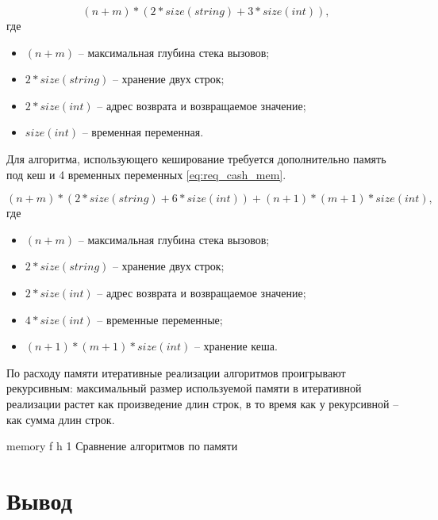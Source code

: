\begin{equation}
	\label{eq:rec_mem}
	(n + m) * (2 * size(string) + 3 * size(int)),
\end{equation}
где 
\begin{itemize}
	\item $ (n + m) $ -- максимальная глубина стека вызовов;
	\item $ 2 * size(string) $ -- хранение двух строк;
	\item $ 2 * size(int) $ -- адрес возврата и возвращаемое значение;
	\item $ size(int) $ -- временная переменная.
\end{itemize}

Для алгоритма, использующего кеширование требуется дополнительно память под кеш и 4 временных переменных \eqref{eq:req_cash_mem}.

\begin{equation}
	\label{eq:req_cash_mem}
	(n + m) * (2 * size(string) + 6 * size(int)) + (n + 1) * (m + 1) * size(int),
\end{equation}
где 
\begin{itemize}
	\item $ (n + m) $ -- максимальная глубина стека вызовов;
	\item $ 2 * size(string) $ -- хранение двух строк;
	\item $ 2 * size(int) $ -- адрес возврата и возвращаемое значение;
	\item $ 4 * size(int) $ -- временные переменные;
	\item $ (n + 1) * (m + 1) * size(int) $ -- хранение кеша.
\end{itemize}

По расходу памяти итеративные реализации алгоритмов проигрывают рекурсивным: максимальный размер используемой памяти в итеративной реализации растет
как произведение длин строк, в то время как у рекурсивной --
как сумма длин строк.

{memory} %
{f} %
{h} %
{1\textwidth} %
{Сравнение алгоритмов по памяти} %

\clearpage


\section*{Вывод}

